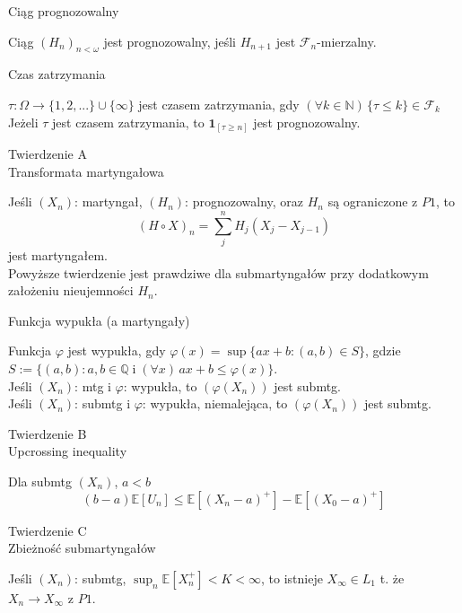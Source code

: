\documentclass[avery5371, grid, frame]{flashcards}
\begin{document}
\begin{flashcard}[Definicja]{Ciąg prognozowalny}

\smallskip
Ciąg $ \left( H_n \right) _{n < \omega} $ jest prognozowalny, jeśli $H_{n+1}$ jest $\mathcal{F}_n$-mierzalny.
\end{flashcard}

\begin{flashcard}[Definicja]{Czas zatrzymania}

\smallskip
$\tau: \Omega \rightarrow \{1, 2, ...\} \cup \{ \infty \}$ jest czasem zatrzymania, gdy $(\forall k \in \mathbb{N}) \, \{ \tau \leq k \} \in \mathcal{F}_k$ \\
Jeżeli $\tau$ jest czasem zatrzymania, to $\mathbf{1}_{[\tau \geq n]}$ jest prognozowalny.
\end{flashcard}

\begin{flashcard}[Twierdzenie]{Twierdzenie A \\ Transformata martyngałowa}

\smallskip
Jeśli $(X_n)$: martyngał, $(H_n)$: prognozowalny, oraz $H_n$ są ograniczone z $P1$, to
$$ (H \circ X)_n = \sum ^n _j H_j (X_j - X_{j-1})  $$
jest martyngałem. \\
Powyższe twierdzenie jest prawdziwe dla submartyngałów przy dodatkowym założeniu nieujemności $H_n$.
\end{flashcard}

\begin{flashcard}[Definicja]{Funkcja wypukła (a martyngały)}

\smallskip
Funkcja $\varphi$ jest wypukła, gdy $\varphi(x) = \sup \{ ax+b : (a, b) \in S\}$, gdzie $S := \{(a, b) : a, b \in \mathbb{Q} \; \text{i} \; (\forall x) \, ax+b \leq \varphi(x) \}$. \\
Jeśli $(X_n)$: mtg i $\varphi$: wypukła, to $(\varphi(X_n))$ jest submtg. \\
Jeśli $(X_n)$: submtg i $\varphi$: wypukła, niemalejąca, to $(\varphi(X_n))$ jest submtg.
\end{flashcard}

\begin{flashcard}[Twierdzenie]{Twierdzenie B \\ Upcrossing inequality}

\smallskip
Dla submtg $(X_n)$, $ a < b $
$$ (b-a) \mathbb{E}[U_n] \leq \mathbb{E}[(X_n-a)^+] - \mathbb{E}[(X_0 - a)^+]$$
\end{flashcard}

\begin{flashcard}[Twierdzenie]{Twierdzenie C \\ Zbieżność submartyngałów}

\smallskip
Jeśli $(X_n)$: submtg, $\sup _n \mathbb{E}[X ^+ _n] < K < \infty$, to istnieje $X_\infty \in L_1$ t. że $X_n \rightarrow X_\infty$ z $P1$.
\end{flashcard}
\end{document}
